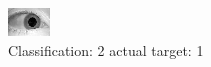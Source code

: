 \begin{figure}[h!]
\begin{center}
\includegraphics[width=0.60\columnwidth]{figures/ID1471_class_2_target_1.png}
\end{center}
\caption{ Classification: 2 actual target: 1}
\label{fig:ID1471_class_2_target_1}
\end{figure}
